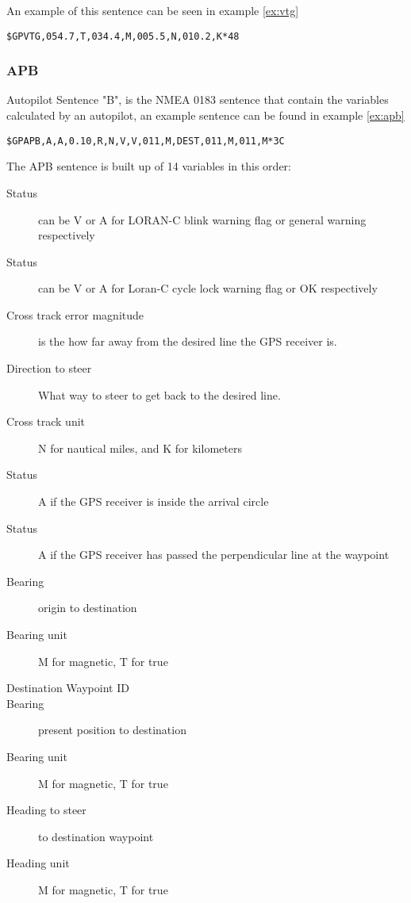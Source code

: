 An example of this sentence can be seen in example \ref{ex:vtg}
\begin{ex}
\texttt{\$GPVTG,054.7,T,034.4,M,005.5,N,010.2,K*48}
\label{ex:vtg}
\end{ex}

\subsubsection{APB}
Autopilot Sentence "B", is the NMEA 0183 sentence that contain the variables calculated by an autopilot, an example sentence can be found in example \ref{ex:apb}

\begin{ex}
\texttt{\$GPAPB,A,A,0.10,R,N,V,V,011,M,DEST,011,M,011,M*3C }
\label{ex:apb}
\end{ex}

The APB sentence is built up of 14 variables in this order:
\begin{description}
\item[Status] can be V or A for LORAN-C blink warning flag or general warning respectively 
\item[Status] can be V or A for Loran-C cycle lock warning flag or OK respectively
\item[Cross track error magnitude] is the how far away from the desired line the GPS receiver is.  
\item[Direction to steer] What way to steer to get back to the desired line.
\item[Cross track unit] N for nautical miles, and K for kilometers
\item[Status] A if the GPS receiver is inside the arrival circle
\item[Status] A if the GPS receiver has passed the perpendicular line at the waypoint
\item[Bearing] origin to destination 
\item[Bearing unit] M for magnetic, T for true
\item[Destination Waypoint ID]
\item[Bearing] present position to destination 
\item[Bearing unit] M for magnetic, T for true
\item[Heading to steer] to destination waypoint 
\item[Heading unit] M for magnetic, T for true
\end{description}






